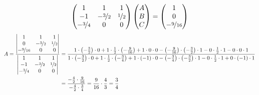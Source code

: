 \documentclass[11pt,a4paper,DIV=12]{scrartcl}
\begin{document}
\begin{gather}
	\begin{pmatrix}
		1 & 1 & 1 \\
		-1 & -\nicefrac{3}{2} & \nicefrac{1}{2} \\
		-\nicefrac{3}{4} & 0 & 0
	\end{pmatrix}
	\begin{pmatrix}
		A \\
		B \\
		C
	\end{pmatrix}
	=
	\begin{pmatrix}
		1 \\
		0 \\
		-\nicefrac{9}{16}
	\end{pmatrix}
\end{gather}
%
%
%
\begin{align}
	A=
	\frac{
		\begin{vmatrix}
			1 & 1 & 1 \\
			0 & -\nicefrac{3}{2} & \nicefrac{1}{2} \\
			-\nicefrac{9}{16} & 0 & 0
		\end{vmatrix}
	}
	{
		\begin{vmatrix}
			1 & 1 & 1 \\
			-1 & -\nicefrac{3}{2} & \nicefrac{1}{2} \\
			-\nicefrac{3}{4} & 0 & 0
		\end{vmatrix}
	}
	&=\frac
	{%
	1 \cdot \left(-\frac{3}{2}\right) \cdot 0 +
	1 \cdot \frac{1}{2} \cdot\left(-\frac{9}{16}\right) +
	1 \cdot 0 \cdot 0 -
	\left(-\frac{9}{16}\right) \cdot \left(-\frac{3}{2}\right) \cdot 1 -
	0 \cdot \frac{1}{2} \cdot 1 -
	0 \cdot 0 \cdot 1
	}
	{%
	1 \cdot \left(-\frac{3}{2}\right) \cdot 0 +
	1\cdot \frac{1}{2} \cdot \left(-\frac{3}{4}\right) +
	1\cdot \left(-1\right) \cdot 0 -
	\left(-\frac{3}{4}\right) \cdot \left(-\frac{3}{2}\right) \cdot 1 -
	0 \cdot \frac{1}{2} \cdot 1 +
	0 \cdot \left(-1\right) \cdot 1
	}\nonumber \\
	&=\frac{-\frac{4}{2}\cdot\frac{9}{16}}{-\frac{4}{2}\cdot\frac{3}{4}}=\frac{9}{16}\cdot\frac{4}{3}=\frac{3}{4}
\end{align}
%
%
%
\end{document}
